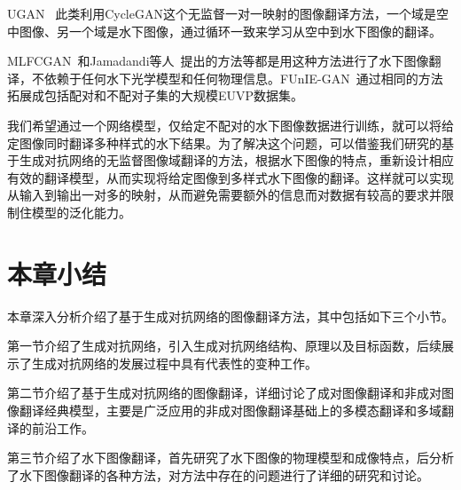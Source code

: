 UGAN~
\cite{fabbri2018enhancing}此类利用CycleGAN这个无监督一对一映射的图像翻译方法，一个域是空中图像、另一个域是水下图像，通过循环一致来学习从空中到水下图像的翻译。

MLFCGAN~\cite{liu2019mlfCGAN}和Jamadandi等人~\cite{jamadandi2019exemplar}提出的方法等都是用这种方法进行了水下图像翻译，不依赖于任何水下光学模型和任何物理信息。FUnIE-GAN~\cite{islam2020fast}通过相同的方法拓展成包括配对和不配对子集的大规模EUVP数据集。

我们希望通过一个网络模型，仅给定不配对的水下图像数据进行训练，就可以将给定图像同时翻译多种样式的水下结果。为了解决这个问题，可以借鉴我们研究的基于生成对抗网络的无监督图像域翻译的方法，根据水下图像的特点，重新设计相应有效的翻译模型，从而实现将给定图像到多样式水下图像的翻译。这样就可以实现从输入到输出一对多的映射，从而避免需要额外的信息而对数据有较高的要求并限制住模型的泛化能力。

\section{本章小结}
本章深入分析介绍了基于生成对抗网络的图像翻译方法，其中包括如下三个小节。

第一节介绍了生成对抗网络，引入生成对抗网络结构、原理以及目标函数，后续展示了生成对抗网络的发展过程中具有代表性的变种工作。

第二节介绍了基于生成对抗网络的图像翻译，详细讨论了成对图像翻译和非成对图像翻译经典模型，主要是广泛应用的非成对图像翻译基础上的多模态翻译和多域翻译的前沿工作。

第三节介绍了水下图像翻译，首先研究了水下图像的物理模型和成像特点，后分析了水下图像翻译的各种方法，对方法中存在的问题进行了详细的研究和讨论。